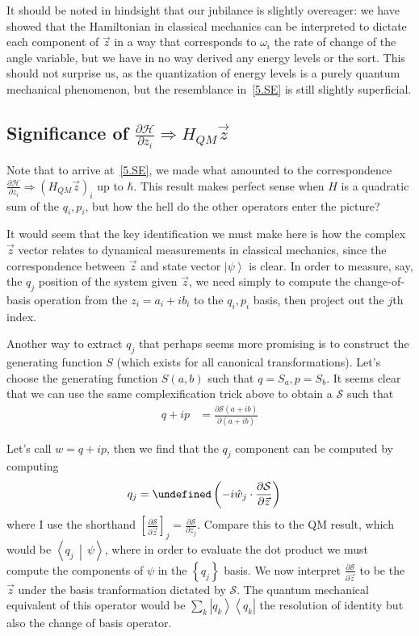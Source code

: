 \documentclass[10pt]{article}
\newcommand{\bra}[1]{\left<#1\right|}
\newcommand{\ket}[1]{\left|#1\right>}
\newcommand{\dotp}[2]{\left<#1\,\middle|\,#2\right>}
\newcommand{\pd}[2]{\frac{\partial#1}{\partial#2}}
\let\Re\undefined
\DeclareMathOperator{\Re}{Re}
\begin{document}
It should be noted in hindsight that our jubilance is slightly overeager: we
have showed that the Hamiltonian in classical mechanics can be interpreted to
dictate each component of $\vec{z}$ in a way that corresponds to $\omega_i$ the
rate of change of the angle variable, but we have in no way derived any energy
levels or the sort. This should not surprise us, as the quantization of energy
levels is a purely quantum mechanical phenomenon, but the resemblance
in~\autoref{5.SE} is still slightly superficial.

\subsection{Significance of $\pd{\mathcal{H}}{z_i} \Rightarrow H_{QM}\vec{z}$}

Note that to arrive at~\eqref{5.SE}, we made what amounted to the correspondence
$\pd{\mathcal{H}}{z_i} \Rightarrow \left( H_{QM}\vec{z} \right)_i$ up to
$\hbar$. This result makes perfect sense when $H$ is a quadratic sum of the
$q_i, p_i$, but how the hell do the other operators enter the picture?

It would seem that the key identification we must make here is how the complex
$\vec{z}$ vector relates to dynamical measurements in classical mechanics, since
the correspondence between $\vec{z}$ and state vector $\ket{\psi}$ is clear. In
order to measure, say, the $q_j$ position of the system given $\vec{z}$, we need
simply to compute the change-of-basis operation from the $z_i = a_i + ib_i$ to
the $q_i, p_i$ basis, then project out the $j$th index.

Another way to extract $q_j$ that perhaps seems more promising is to construct
the generating function $S$ (which exists for all canonical transformations).
Let's choose the generating function $S(a,b)$ such that $q = S_a, p=S_b$. It
seems clear that we can use the same complexification trick above to obtain a
$\mathcal{S}$ such that
\begin{align}
    q + ip &= \pd{\mathcal{S}(a + ib)}{(a+ib)}
\end{align}

Let's call $w=q+ip$, then we find that the $q_j$ component can be computed by computing
\begin{align}
    q_j &= \Re\left(-i\hat{w}_j \cdot \pd{\mathcal{S}}{\vec{z}}\right)
\end{align}
where I use the shorthand
$\left[ \pd{\mathcal{S}}{\vec{z}} \right]_j = \pd{\mathcal{S}}{z_j}$. Compare
this to the QM result, which would be $\dotp{q_j}{\psi}$, where in order to
evaluate the dot product we must compute the components of $\psi$ in the
$\left\{ q_j \right\}$ basis. We now interpret $\pd{\mathcal{S}}{\vec{z}}$ to be
the $\vec{z}$ under the basis tranformation dictated by $\mathcal{S}$. The
quantum mechanical equivalent of this operator would be $\sum_k
\ket{q_k}\bra{q_k}$ the resolution of identity but also the change of basis
operator.
\end{document}
